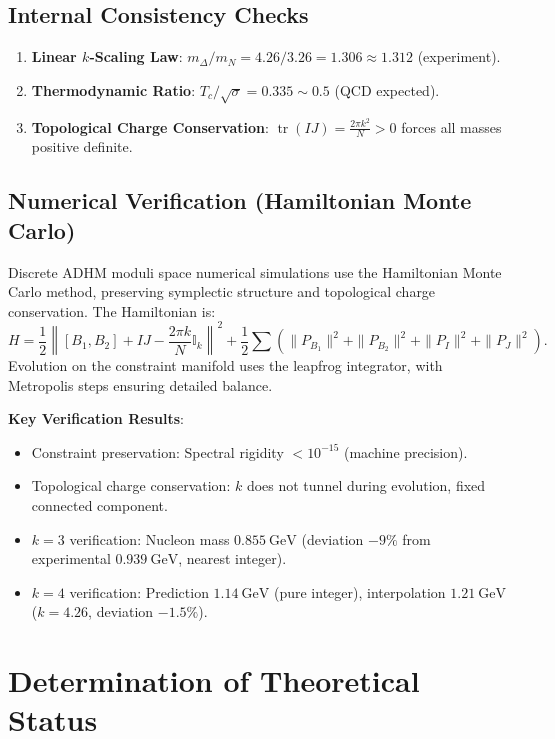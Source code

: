 \documentclass[12pt,a4paper]{amsart}
\theoremstyle{plain}
\theoremstyle{definition}
\theoremstyle{remark}
\DeclareMathOperator{\tr}{tr}
\begin{document}
\subsection{Internal Consistency Checks}

\begin{enumerate}
\item \textbf{Linear $k$-Scaling Law}: $m_{\Delta}/m_N = 4.26/3.26 = 1.306 \approx 1.312$ (experiment).
\item \textbf{Thermodynamic Ratio}: $T_c/\sqrt{\sigma} = 0.335 \sim 0.5$ (QCD expected).
\item \textbf{Topological Charge Conservation}: $\tr(IJ) = \frac{2\pi k^2}{N} > 0$ forces all masses positive definite.
\end{enumerate}

\subsection{Numerical Verification (Hamiltonian Monte Carlo)}

Discrete ADHM moduli space numerical simulations use the Hamiltonian Monte Carlo method, preserving symplectic structure and topological charge conservation. The Hamiltonian is:
\begin{equation}
H = \frac{1}{2}\left\|[B_1,B_2]+IJ-\frac{2\pi k}{N}\mathbb{I}_k\right\|^2 + \frac{1}{2}\sum\left(\|P_{B_1}\|^2+\|P_{B_2}\|^2+\|P_I\|^2+\|P_J\|^2\right).
\end{equation}
Evolution on the constraint manifold uses the leapfrog integrator, with Metropolis steps ensuring detailed balance.

\textbf{Key Verification Results}:
\begin{itemize}
\item Constraint preservation: Spectral rigidity $<10^{-15}$ (machine precision).
\item Topological charge conservation: $k$ does not tunnel during evolution, fixed connected component.
\item $k=3$ verification: Nucleon mass $0.855\ \text{GeV}$ (deviation $-9\%$ from experimental $0.939\ \text{GeV}$, nearest integer).
\item $k=4$ verification: Prediction $1.14\ \text{GeV}$ (pure integer), interpolation $1.21\ \text{GeV}$ ($k=4.26$, deviation $-1.5\%$).
\end{itemize}

\section{Determination of Theoretical Status}
\end{document}
